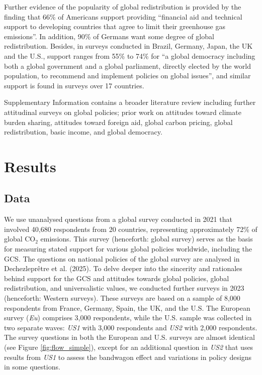 \documentclass[12pt,english]{article}
\begin{document}
Further evidence of the popularity of global redistribution is provided by the finding that 66\% of Americans support providing ``financial aid and technical support to developing countries that agree to limit their greenhouse gas emissions''.\cite{leiserowitz_public_2021} In addition, 90\% of Germans want some degree of global redistribution.\cite{fehr_your_2022} 
Besides, in surveys conducted in Brazil, Germany, Japan, the UK and the U.S., support ranges from 55\% to 74\% for ``a global democracy including both a global government and a global parliament, directly elected by the world population, to recommend and implement policies on global issues'', and similar support is found in surveys over 17 countries.\cite{ghassim_who_2020,ghassim_who_2024} %

Supplementary Information contains a broader literature review including further attitudinal surveys on global policies; prior work on attitudes toward climate burden sharing, attitudes toward foreign aid, global carbon pricing, global redistribution, basic income, and global democracy.

\section{Results}

\subsection{Data}\label{subsec:data}

We use unanalysed questions from a global survey conducted in 2021 that involved 40,680 respondents from 20 countries, representing approximately 72\% of global CO$_\text{2}$ emissions. 
This survey (henceforth: global survey) serves as the basis for measuring stated support for various global policies worldwide, including the GCS. 
The %
questions on national policies of the global survey are analysed in Dechezleprêtre et al. (2025).\cite{dechezlepretre_fighting_nodate}
To delve deeper into the sincerity and rationales behind support for the GCS and attitudes towards global policies, global redistribution, and universalistic values, we conducted further surveys  in 2023 (henceforth: Western surveys). These surveys are based on a sample of 8,000 respondents from France, Germany, Spain, the UK, and the U.S. The European survey (\textit{Eu}) comprises 3,000 respondents, while the U.S. sample was collected in two separate waves: \textit{US1} with 3,000 respondents and \textit{US2} with 2,000 respondents. The survey questions in both the European and U.S. surveys are almost identical (see Figure \ref{fig:flow_simple}), except for an additional question in \textit{US2} that uses results from \textit{US1} to assess the bandwagon effect and variations in policy designs in some questions.
\end{document}
